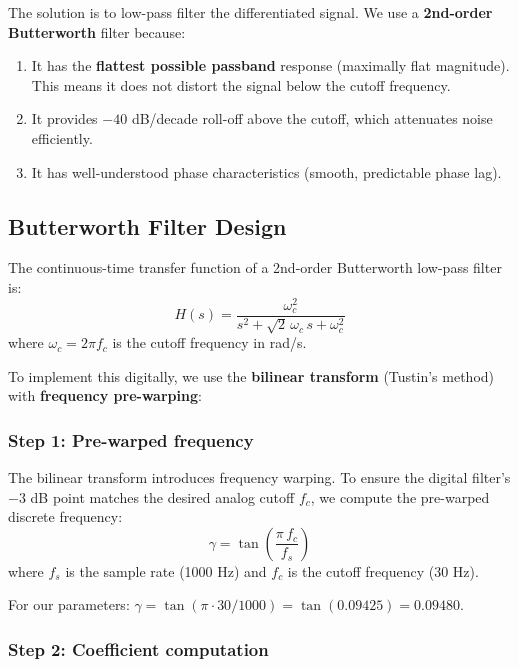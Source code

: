 \documentclass[12pt, a4paper]{article}
\begin{document}
The solution is to low-pass filter the differentiated signal.  We use a \textbf{2nd-order Butterworth} filter because:
\begin{enumerate}
    \item It has the \textbf{flattest possible passband} response (maximally flat magnitude).  This means it does not distort the signal below the cutoff frequency.
    \item It provides $-40$ dB/decade roll-off above the cutoff, which attenuates noise efficiently.
    \item It has well-understood phase characteristics (smooth, predictable phase lag).
\end{enumerate}

\subsection{Butterworth Filter Design}

The continuous-time transfer function of a 2nd-order Butterworth low-pass filter is:
\begin{equation}
    H(s) = \frac{\omega_c^2}{s^2 + \sqrt{2}\,\omega_c\,s + \omega_c^2}
\end{equation}
where $\omega_c = 2\pi f_c$ is the cutoff frequency in rad/s.

To implement this digitally, we use the \textbf{bilinear transform} (Tustin's method) with \textbf{frequency pre-warping}:

\subsubsection{Step 1: Pre-warped frequency}

The bilinear transform introduces frequency warping.  To ensure the digital filter's $-3$ dB point matches the desired analog cutoff $f_c$, we compute the pre-warped discrete frequency:
\begin{equation}
    \gamma = \tan\!\left(\frac{\pi \, f_c}{f_s}\right)
\end{equation}
where $f_s$ is the sample rate (1000 Hz) and $f_c$ is the cutoff frequency (30 Hz).

For our parameters: $\gamma = \tan(\pi \cdot 30 / 1000) = \tan(0.09425) = 0.09480$.

\subsubsection{Step 2: Coefficient computation}
\end{document}
